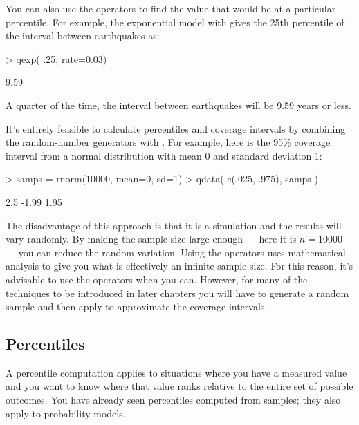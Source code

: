 
You can also use the  operators to find the value that would
be at a particular percentile.  For example, the exponential model with  
gives the 25th percentile of
the interval between earthquakes as:
\begin{Schunk}
\begin{Sinput}
> qexp( .25, rate=0.03)
\end{Sinput}
\begin{Soutput}
[1] 9.59
\end{Soutput}
\end{Schunk}
A quarter of the time, the interval between earthquakes will be 9.59
years or less.

It's entirely feasible to calculate percentiles and 
coverage intervals by combining
the random-number generators with .  For example, here
is the 95\% coverage interval from a normal distribution with mean 0
and standard deviation 1:
\begin{Schunk}
\begin{Sinput}
> samps = rnorm(10000, mean=0, sd=1)
> qdata( c(.025, .975), samps )
\end{Sinput}
\begin{Soutput}
 2.5% 97.5% 
-1.99  1.95 
\end{Soutput}
\end{Schunk}
The disadvantage of this approach is that it is a simulation and the
results will vary randomly.  By making the sample size large enough
--- here it is $n=10000$ --- you can reduce the random variation. 
Using the  operators uses mathematical analysis to give 
you what is effectively an
infinite sample size.  For this reason, it's advisable to use the
 operators when you can.  However, for many of the techniques to
be introduced in later chapters you will have to generate a random
sample and then apply  to approximate the coverage intervals.

\subsection{Percentiles}


A percentile computation applies to situations where you have a
measured value and you want to know where that value ranks relative to
the entire set of possible outcomes.  You have already seen
percentiles computed from samples; they also apply to probability models.

